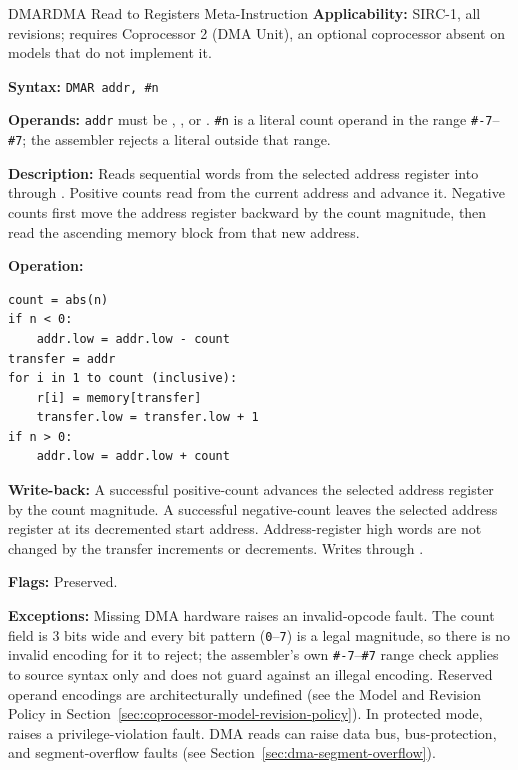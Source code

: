 \begin{instructionbox}{DMAR}{DMA Read to Registers Meta-Instruction}
	\textbf{Applicability:} SIRC-1, all revisions; requires Coprocessor 2 (DMA Unit), an optional coprocessor absent
	on models that do not implement it.

	\textbf{Syntax:} \texttt{DMAR addr, \#n}

	\textbf{Operands:} \texttt{addr} must be , , or . \texttt{\#n} is a literal count operand in the
	range \texttt{\#-7}--\texttt{\#7}; the assembler rejects a literal outside that range.

	\textbf{Description:} Reads sequential words from the selected address register into  through .
	Positive counts read from the current address and advance it. Negative counts first move the address register backward
	by the count magnitude, then read the ascending memory block from that new address.

	\textbf{Operation:}
	\begin{verbatim}
count = abs(n)
if n < 0:
    addr.low = addr.low - count
transfer = addr
for i in 1 to count (inclusive):
    r[i] = memory[transfer]
    transfer.low = transfer.low + 1
if n > 0:
    addr.low = addr.low + count
\end{verbatim}

	\textbf{Write-back:} A successful positive-count  advances the selected address register by the count
	magnitude. A successful negative-count  leaves the selected address register at its decremented start
	address. Address-register high words are not changed by the transfer increments or decrements. Writes 
	through .

	\textbf{Flags:} Preserved.

	\textbf{Exceptions:} Missing DMA hardware raises an invalid-opcode fault. The count field is 3 bits wide and
	every bit pattern (\texttt{0}--\texttt{7}) is a legal magnitude, so there is no invalid encoding for it to
	reject; the assembler's own \texttt{\#-7}--\texttt{\#7} range check applies to source syntax only and does not
	guard against an illegal encoding. Reserved operand encodings are architecturally undefined (see the
	Model and Revision Policy in
	Section~\ref{sec:coprocessor-model-revision-policy}). In protected mode, raises a privilege-violation fault. DMA reads can raise
	data bus, bus-protection, and segment-overflow faults (see Section~\ref{sec:dma-segment-overflow}).


\end{instructionbox}
